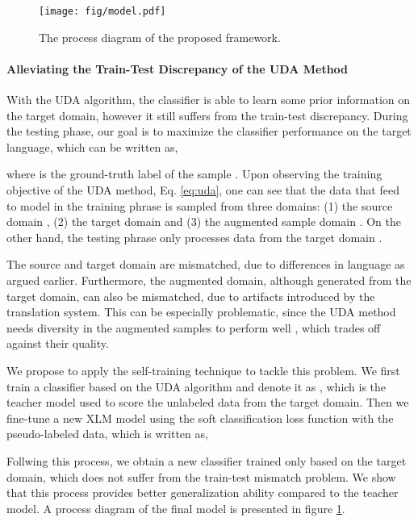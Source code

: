 \documentclass{article} \usepackage{iclr2020_conference,times}
\begin{document}
\begin{figure}
    \centering
    \texttt{[image: fig/model.pdf]}
    \caption{The process diagram of the proposed framework.}
    \label{fig:process}
\end{figure}

\paragraph{Alleviating the Train-Test Discrepancy of the UDA Method}
With the UDA algorithm, the classifier is able to learn some prior information on the target domain, however it still suffers from the train-test discrepancy. 
During the testing phase, our goal is to maximize the classifier performance on the target language, which can be written as,

where  is the ground-truth label of the sample . 
Upon observing the training objective of the UDA method, Eq. \eqref{eq:uda}, one can see that the data  that feed to model in the training phrase is sampled from three domains: (1) the source domain , (2) the target domain  and (3) the augmented sample domain . 
On the other hand, the testing phrase only processes data from the target domain .

The source and target domain are mismatched, due to differences in language as argued earlier.  Furthermore, the augmented domain, although generated from the target domain, can also be mismatched, due to artifacts introduced by the translation system.  This can be especially problematic, since the UDA method needs diversity in the augmented samples to perform well \citep{xie2019unsupervised}, which trades off against their quality.

We propose to apply the self-training technique \citep{lee2013pseudo} to tackle this problem. 
We first train a classifier based on the UDA algorithm and denote it as , which is the teacher model used to score the unlabeled data  from the target domain.  
Then we fine-tune a new XLM model using the soft classification loss function with the pseudo-labeled data, which is written as,

Follwing this process, we obtain a new classifier trained only based on the target domain, which does not suffer from the train-test mismatch problem. We show that this process provides better generalization ability compared to the teacher model. A process diagram of the final model is presented in figure \ref{fig:process}.
\end{document}
